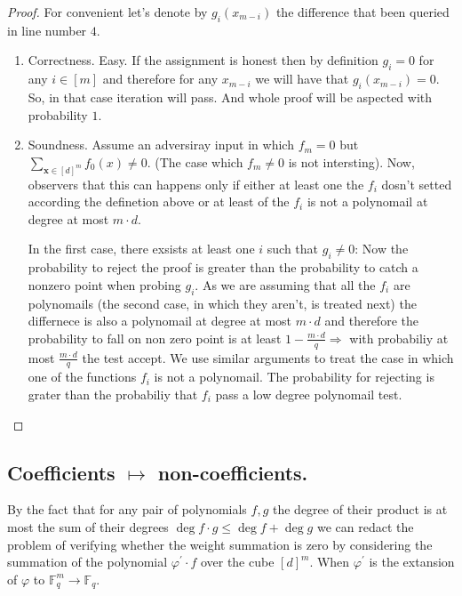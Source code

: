\documentclass{article}
\newcommand{\FF}{\mathbb{F}_{q}}
\begin{document}
\begin{proof} For convenient let's denote by $g_{i}\left( x_{m-i} \right)$ the difference that been queried in line number $4$. 
  \begin{enumerate}
    \item Correctness. Easy. If the assignment is honest then by definition $g_{i} = 0$ for any $i \in [m]$ and therefore for any $x_{m-i}$ we will have that $g_{i} \left( x_{m-i} \right) = 0$. So, in that case iteration will pass. And whole proof will be aspected  with probability $1$.  
    \item Soundness. Assume an adversiray input in which $f_{m} = 0$ but $\sum_{\mathbf{x} \in [d]^{m}}{f_{0}(x)}\neq 0$. (The case which $f_{m} \neq 0$ is not intersting). Now, observers that this can happens only if either at least one the $f_{i}$ dosn't setted according the definetion above or at least of the $f_{i}$ is not a polynomail at degree at most $m\cdot d $. 

      In the first case, there exsists at least one $i$ such that $g_{i}\neq 0$:
      Now the probability to reject the proof is greater than the probability to catch a nonzero point when probing $g_{i}$. As we are assuming that all the $f_{i}$ are polynomails (the second case, in which they aren't, is treated next) the differnece is also a polynomail at degree at most $m\cdot d$ and therefore the probability to fall on non zero point is at least $1 - \frac{m\cdot d}{q} \Rightarrow $  with probabiliy at most $\frac{m\cdot d}{q}$ the test accept. 
      We use similar arguments to treat the case in which one of the functions $f_{i}$ is not a polynomail. The probability for rejecting is grater than the probabiliy that $f_{i}$ pass a low degree polynomail test. 
  \end{enumerate}
\end{proof}

\subsection{ Coefficients $\mapsto$ non-coefficients. }
By the fact that for any pair of polynomials $f,g$ the degree of their product is at most the sum of their degrees  $\deg f \cdot g \le \deg f + \deg g$  we can redact the problem of verifying whether the weight summation is zero by considering the summation of the polynomial $\varphi^{\prime} \cdot f$ over the cube $[d]^{m}$. When $\varphi^{\prime}$ is the extansion of $\varphi$  to $\FF^{m} \rightarrow \FF$. 
\end{document}
